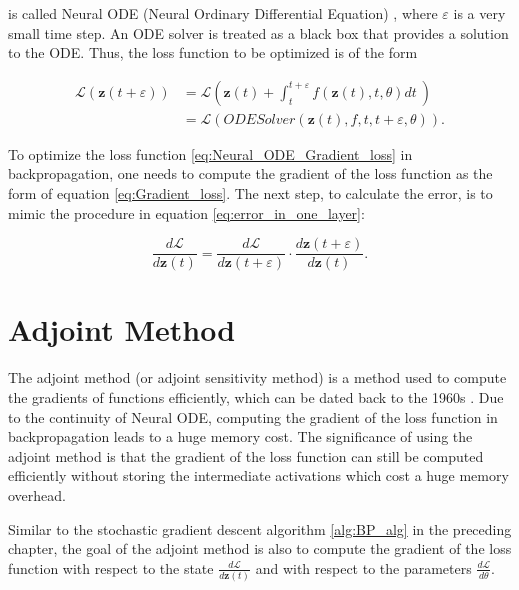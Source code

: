 \documentclass[
	parskip, 			   %
	twoside, 			   %
	DIV=14, 			   %
	BCOR=15.0mm, 		   %
	headsepline, 		   %
	open=right, 		   %
	captions=tableheading, %
	bibliography=totoc,    %
	numbers=noenddot       %
]{scrreprt}
\begin{document}
is called Neural ODE (Neural Ordinary Differential Equation) \cite{chen2018neural}, where $\varepsilon $ is a very small time step. An ODE solver is treated as a black box that provides a solution to the ODE. Thus, the loss function to be optimized is of the form

\begin{equation}
    \label{eq:Neural_ODE_Gradient_loss}
    \begin{aligned}
    \mathcal{L}(\mathbf{z}(t+\varepsilon )) &= \mathcal{L}(\mathbf{z}(t) + \int_{t}^{t+\varepsilon } f(\mathbf{z}(t), t, \theta)dt \:)\\
    &= \mathcal{L}(ODESolver(\mathbf{z}(t), f, t, t+\varepsilon , \theta)).
    \end{aligned}
\end{equation}

To optimize the loss function \ref{eq:Neural_ODE_Gradient_loss} in backpropagation, one needs to compute the gradient of the loss function as the form of equation \ref{eq:Gradient_loss}. The next step, to calculate the error, is to mimic the procedure in equation \ref{eq:error_in_one_layer}:

\begin{equation}
    \label{eq:Neural_ODE_error}
    \frac{d\mathcal{L}}{d\mathbf{z}(t)} = \frac{d\mathcal{L}}{d\mathbf{z}(t+\varepsilon )} \cdot \frac{d\mathbf{z}(t+\varepsilon )}{d\mathbf{z}(t)}.
\end{equation}

\section{Adjoint Method}
The adjoint method (or adjoint sensitivity method) is a method used to compute the gradients of functions efficiently, which can be dated back to the 1960s \cite{boltyanskiy1962mathematical}. Due to the continuity of Neural ODE, computing the gradient of the loss function in backpropagation leads to a huge memory cost. The significance of using the adjoint method is that the gradient of the loss function can still be computed efficiently without storing the intermediate activations which cost a huge memory overhead.

Similar to the stochastic gradient descent algorithm \ref{alg:BP_alg} in the preceding chapter, the goal of the adjoint method is also to compute the gradient of the loss function with respect to the state $\frac{d\mathcal{L}}{d\mathbf{z}(t)}$ and with respect to the parameters $\frac{d\mathcal{L}}{d\theta}$.
\end{document}
